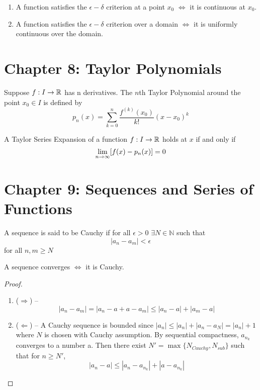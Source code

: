 \documentclass{article}
\begin{document}
\begin{theorem}
    \hfill
    \begin{enumerate}
        \item A function satisfies the $\epsilon-\delta$ criterion at a point $x_0$
        $\Longleftrightarrow$ it is continuous at $x_0$.
        \item A function satisfies the $\epsilon-\delta$ criterion over a domain 
        $\Longleftrightarrow$ it is uniformly continuous over the domain.
    \end{enumerate}
\end{theorem}

\section{Chapter 8: Taylor Polynomials}

\begin{definition}
    Suppose $f:I\rightarrow \mathbb{R}$ has n derivatives. The $n$th Taylor Polynomial around 
    the point $x_0\in I$ is defined by
    \[ p_n(x) = \sum_{k=0}^n \frac{f^{(k)}(x_0)}{k!}(x-x_0)^k \]
\end{definition}

\begin{remark}
   A Taylor Series Expansion of a function $f:I\rightarrow \mathbb{R}$ holds at $x$ if and only if 
   \[ \lim_{n \to \infty} [f(x) - p_n(x)] = 0 \]
\end{remark}

\section{Chapter 9: Sequences and Series of Functions}

\begin{definition}
    A sequence is said to be Cauchy if for all $\epsilon>0$ $\exists N\in \mathbb{N}$
    such that 
    \[ |a_n - a_m| < \epsilon \] for all $n,m \geq N$
\end{definition}

\begin{theorem}
    A sequence converges $\Longleftrightarrow$ it is Cauchy.
\end{theorem}

\begin{proof}
    \hfill
    \begin{enumerate}
        \item ($\Rightarrow$) -- 
        \[ |a_n - a_m| = |a_n -a +a -a_m| \leq |a_n -a| + |a_m - a| \]
        \item ($\Leftarrow$) --
        A Cauchy sequence is bounded since $|a_n| \leq |a_n| + |a_n-a_N| = |a_n| + 1$
        where $N$ is chosen with Cauchy assumption. By sequential compactness, $a_{n_k}$ converges to
        a number a. Then there exist $N'=\max\{N_{Cauchy},N_{sub}\}$ such that for
        $n\geq N'$,
        \[ |a_n -a | \leq |a_n-a_{n_k}| + |a - a_{n_k}| \]
    \end{enumerate}
\end{proof}
\end{document}
